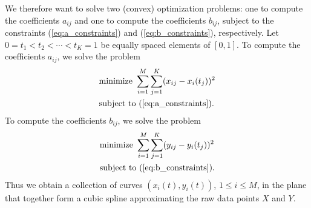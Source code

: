 \documentclass[letterpaper,12pt]{article}
\begin{document}
\begin{enumerate}
  We therefore want to solve two (convex) optimization problems: one
  to compute the coefficients $a_{ij}$ and one to compute the
  coefficients $b_{ij}$, subject to the constraints
  (\ref{eq:a_constraints}) and (\ref{eq:b_constraints}),
  respectively. Let $0 = t_1 < t_2 < \cdots < t_K = 1$ be equally
  spaced elements of $[0, 1]$. To compute the coefficients $a_{ij}$,
  we solve the problem
  \begin{align*}
    &\text{minimize} \ \sum_{i=1}^M \sum_{j=1}^K (x_{ij} - x_i(t_j))^2 \\
    &\text{subject to} \ (\ref{eq:a_constraints}).
  \end{align*}
  To compute the coefficients $b_{ij}$, we solve the problem
  \begin{align*}
    &\text{minimize} \ \sum_{i=1}^M \sum_{j=1}^K (y_{ij} - y_i(t_j))^2 \\
    &\text{subject to} \ (\ref{eq:b_constraints}).
  \end{align*}
  Thus we obtain a collection of curves $(x_i(t), y_i(t))$,
  $1 \leq i \leq M$, in the plane that together form a cubic spline
  approximating the raw data points $X$ and $Y$.

\end{enumerate}
\end{document}
